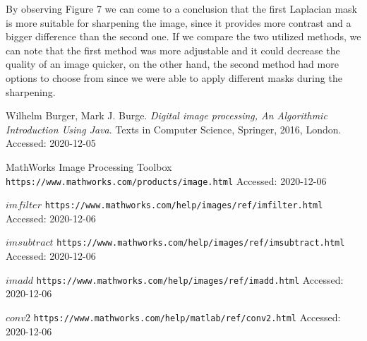 \documentclass{article}
\begin{document}
By observing Figure 7 we can come to a conclusion that the first Laplacian mask is more suitable for sharpening the image, since it provides more contrast and a bigger difference than the second one.
\newline
\newline
If we compare the two utilized methods, we can note that the first method was more adjustable and it could decrease the quality of an image quicker, on the other hand, the second method had more options to choose from since we were able to apply different masks during the sharpening.



\begin{thebibliography}{9}

Wilhelm Burger, Mark J. Burge. 
\textit{Digital image processing, An Algorithmic Introduction Using Java}.
Texts in Computer Science, Springer, 2016, London.
{Accessed: 2020-12-05}

MathWorks Image Processing Toolbox \texttt{https://www.mathworks.com/products/image.html}
{Accessed: 2020-12-06}

$imfilter$
\texttt{https://www.mathworks.com/help/images/ref/imfilter.html}
{Accessed: 2020-12-06}

$imsubtract$ \texttt{https://www.mathworks.com/help/images/ref/imsubtract.html}
{Accessed: 2020-12-06}

$imadd$ \texttt{https://www.mathworks.com/help/images/ref/imadd.html}
{Accessed: 2020-12-06}

$conv2$ \texttt{https://www.mathworks.com/help/matlab/ref/conv2.html}
{Accessed: 2020-12-06}

\end{thebibliography}
\end{document}
